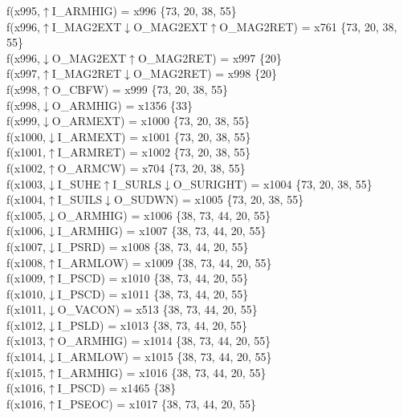 f(x995,$\uparrow$I\_ARMHIG) = x996 \{73, 20, 38, 55\} \\  
f(x996,$\uparrow$I\_MAG2EXT$\downarrow$O\_MAG2EXT$\uparrow$O\_MAG2RET) = x761 \{73, 20, 38, 55\} \\  
f(x996,$\downarrow$O\_MAG2EXT$\uparrow$O\_MAG2RET) = x997 \{20\} \\  
f(x997,$\uparrow$I\_MAG2RET$\downarrow$O\_MAG2RET) = x998 \{20\} \\  
f(x998,$\uparrow$O\_CBFW) = x999 \{73, 20, 38, 55\} \\  
f(x998,$\downarrow$O\_ARMHIG) = x1356 \{33\} \\  
f(x999,$\downarrow$O\_ARMEXT) = x1000 \{73, 20, 38, 55\} \\  
f(x1000,$\downarrow$I\_ARMEXT) = x1001 \{73, 20, 38, 55\} \\  
f(x1001,$\uparrow$I\_ARMRET) = x1002 \{73, 20, 38, 55\} \\  
f(x1002,$\uparrow$O\_ARMCW) = x704 \{73, 20, 38, 55\} \\  
f(x1003,$\downarrow$I\_SUHE$\uparrow$I\_SURLS$\downarrow$O\_SURIGHT) = x1004 \{73, 20, 38, 55\} \\  
f(x1004,$\uparrow$I\_SUILS$\downarrow$O\_SUDWN) = x1005 \{73, 20, 38, 55\} \\  
f(x1005,$\downarrow$O\_ARMHIG) = x1006 \{38, 73, 44, 20, 55\} \\  
f(x1006,$\downarrow$I\_ARMHIG) = x1007 \{38, 73, 44, 20, 55\} \\  
f(x1007,$\downarrow$I\_PSRD) = x1008 \{38, 73, 44, 20, 55\} \\  
f(x1008,$\uparrow$I\_ARMLOW) = x1009 \{38, 73, 44, 20, 55\} \\  
f(x1009,$\uparrow$I\_PSCD) = x1010 \{38, 73, 44, 20, 55\} \\  
f(x1010,$\downarrow$I\_PSCD) = x1011 \{38, 73, 44, 20, 55\} \\  
f(x1011,$\downarrow$O\_VACON) = x513 \{38, 73, 44, 20, 55\} \\  
f(x1012,$\downarrow$I\_PSLD) = x1013 \{38, 73, 44, 20, 55\} \\  
f(x1013,$\uparrow$O\_ARMHIG) = x1014 \{38, 73, 44, 20, 55\} \\  
f(x1014,$\downarrow$I\_ARMLOW) = x1015 \{38, 73, 44, 20, 55\} \\  
f(x1015,$\uparrow$I\_ARMHIG) = x1016 \{38, 73, 44, 20, 55\} \\  
f(x1016,$\uparrow$I\_PSCD) = x1465 \{38\} \\  
f(x1016,$\uparrow$I\_PSEOC) = x1017 \{38, 73, 44, 20, 55\} \\  

